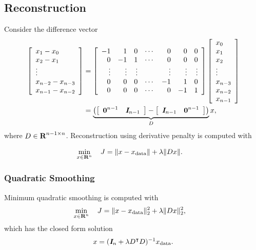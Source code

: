\documentclass{article}
\begin{document}
\subsection{Reconstruction}
Consider the difference vector
\begin{align*}
    \left[\begin{array}{lllllllllllllllllll}x_1-x_0\\x_2-x_1\\\vdots\\x_{n-2}-x_{n-3}\\x_{n-1}-x_{n-2}\end{array}\right]
    &=\left[\begin{array}{rrrrrrr}
        -1 & 1 & 0 & \cdots & 0 & 0 & 0\\
        0& -1 & 1 & \cdots & 0 & 0 & 0\\
        \vdots & \vdots & \vdots &  & \vdots & \vdots & \vdots\\
        0 & 0 & 0 & \cdots & -1 & 1 & 0\\
        0 & 0 & 0 & \cdots & 0 & -1 & 1
    \end{array}\right]\left[\begin{array}{lllllllllllllllllll}x_0\\x_1\\x_2\\\vdots\\x_{n-3}\\x_{n-2}\\x_{n-1}\end{array}\right]\\
    &=\underbrace{\left(\left[\begin{array}{lllllllllllllllllll}\textbf{0}^{n-1}&\emph{\textbf{I}}_{n-1}\end{array}\right]-\left[\begin{array}{lllllllllllllllllll}\emph{\textbf{I}}_{n-1} & \textbf{0}^{n-1}\end{array}\right]\right)}_{D}x,
\end{align*}
where $D\in\textbf{R}^{n-1\times n}$.
Reconstruction using derivative penalty is computed with

\begin{align*}
    \min_{x\in\textbf{R}^n}\quad J &= \|x-x_{\text{data}}\|+\lambda \|Dx\|.
\end{align*}
\subsubsection{Quadratic Smoothing}
Minimum quadratic smoothing is computed with
\begin{align*}
    \min_{x\in\textbf{R}^n}\quad J &= \|x-x_{\text{data}}\|_2^2+\lambda \|Dx\|_2^2,
\end{align*}
which has the closed form solution
\begin{align*}
    x=(\emph{\textbf{I}}_n+\lambda D^\intercal D)^{-1}x_{\text{data}}.
\end{align*}
\end{document}
